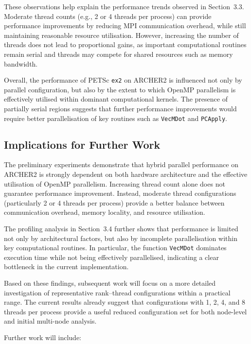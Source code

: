 \documentclass{article}
\begin{document}
These observations help explain the performance trends observed in Section~3.3. 
Moderate thread counts (e.g., 2 or 4 threads per process) can provide performance improvements by reducing MPI communication overhead, while still maintaining reasonable resource utilisation. 
However, increasing the number of threads does not lead to proportional gains, as important computational routines remain serial and threads may compete for shared resources such as memory bandwidth.

Overall, the performance of PETSc \texttt{ex2} on ARCHER2 is influenced not only by parallel configuration, but also by the extent to which OpenMP parallelism is effectively utilised within dominant computational kernels. 
The presence of partially serial regions suggests that further performance improvements would require better parallelisation of key routines such as \texttt{VecMDot} and \texttt{PCApply}.

\subsection{Implications for Further Work}

The preliminary experiments demonstrate that hybrid parallel performance on ARCHER2 is strongly dependent on both hardware architecture and the effective utilisation of OpenMP parallelism. 
Increasing thread count alone does not guarantee performance improvement. 
Instead, moderate thread configurations (particularly 2 or 4 threads per process) provide a better balance between communication overhead, memory locality, and resource utilisation.

The profiling analysis in Section~3.4 further shows that performance is limited not only by architectural factors, but also by incomplete parallelisation within key computational routines. 
In particular, the function \texttt{VecMDot} dominates execution time while not being effectively parallelised, indicating a clear bottleneck in the current implementation.

Based on these findings, subsequent work will focus on a more detailed investigation of representative rank--thread configurations within a practical range. 
The current results already suggest that configurations with 1, 2, 4, and 8 threads per process provide a useful reduced configuration set for both node-level and initial multi-node analysis.

Further work will include:
\end{document}
